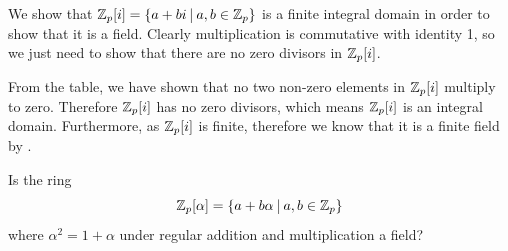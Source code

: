 \begin{example}
    We show that $\Z_p[i] = \{a+bi \vert a,b \in \Z_p\}$ is a finite integral domain in order to show that it is a field. Clearly multiplication is commutative with identity 1, so we just need to show that there are no zero divisors in $\mathbb{Z}_p[i]$.
    \begin{table}[h]
        \centering
    \end{table}
    
    From the table, we have shown that no two non-zero elements in $\mathbb{Z}_p[i]$ multiply to zero. Therefore $\mathbb{Z}_p[i]$ has no zero divisors, which means $\mathbb{Z}_p[i]$ is an integral domain. Furthermore, as $\mathbb{Z}_p[i]$ is finite, therefore we know that it is a finite field by .
\end{example}

\begin{exercise}\label{exercise-Zn2[alpha]}
    Is the ring
    \[
        \Z_p[\alpha] = \{a+b\alpha \vert a,b\in\Z_p\}
    \]
    where $\alpha^2 = 1 + \alpha$ under regular addition and multiplication a field?
\end{exercise}

